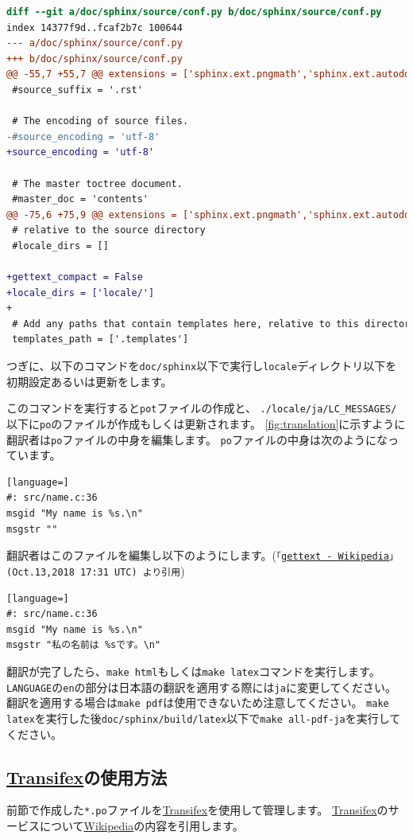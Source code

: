 \documentclass{../../style/ltjoc}
\begin{document}
\begin{lstlisting}[language=diff]
diff --git a/doc/sphinx/source/conf.py b/doc/sphinx/source/conf.py
index 14377f9d..fcaf2b7c 100644
--- a/doc/sphinx/source/conf.py
+++ b/doc/sphinx/source/conf.py
@@ -55,7 +55,7 @@ extensions = ['sphinx.ext.pngmath','sphinx.ext.autodoc',
 #source_suffix = '.rst'

 # The encoding of source files.
-#source_encoding = 'utf-8'
+source_encoding = 'utf-8'

 # The master toctree document.
 #master_doc = 'contents'
@@ -75,6 +75,9 @@ extensions = ['sphinx.ext.pngmath','sphinx.ext.autodoc',
 # relative to the source directory
 #locale_dirs = []

+gettext_compact = False
+locale_dirs = ['locale/']
+
 # Add any paths that contain templates here, relative to this directory.
 templates_path = ['.templates']
\end{lstlisting}
つぎに、以下のコマンドを\texttt{doc/sphinx}以下で実行し\texttt{locale}ディレクトリ以下を初期設定あるいは更新をします。
\begin{shbox}
\end{shbox}
このコマンドを実行すると\texttt{pot}ファイルの作成と、
\texttt{./locale/ja/LC_MESSAGES/}以下に\texttt{po}のファイルが作成もしくは更新されます。
\autoref{fig:translation}に示すように翻訳者は\texttt{po}ファイルの中身を編集します。
\texttt{po}ファイルの中身は次のようになっています。
\begin{lstlisting}[language=]
#: src/name.c:36
msgid "My name is %s.\n"
msgstr ""
\end{lstlisting}
翻訳者はこのファイルを編集し以下のようにします。(\texttt{「\href{https://ja.wikipedia.org/wiki/Gettext}{gettext - Wikipedia}」(Oct.13,2018 17:31 UTC) より引用})
\begin{lstlisting}[language=]
#: src/name.c:36
msgid "My name is %s.\n"
msgstr "私の名前は %sです。\n"
\end{lstlisting}
翻訳が完了したら、\texttt{make html}もしくは\texttt{make latex}コマンドを実行します。
\texttt{LANGUAGE}の\texttt{en}の部分は日本語の翻訳を適用する際には\texttt{ja}に変更してください。
翻訳を適用する場合は\texttt{make pdf}は使用できないため注意してください。
\texttt{make latex}を実行した後\texttt{doc/sphinx/build/latex}以下で\texttt{make all-pdf-ja}を実行してください。

\subsection{\href{https://www.transifex.com}{Transifex}の使用方法}
前節で作成した\texttt{*.po}ファイルを\href{https://www.transifex.com}{Transifex}を使用して管理します。
\href{https://www.transifex.com}{Transifex}のサービスについて\href{https://ja.wikipedia.org/wiki/Transifex}{Wikipedia}の内容を引用します。
\end{document}
